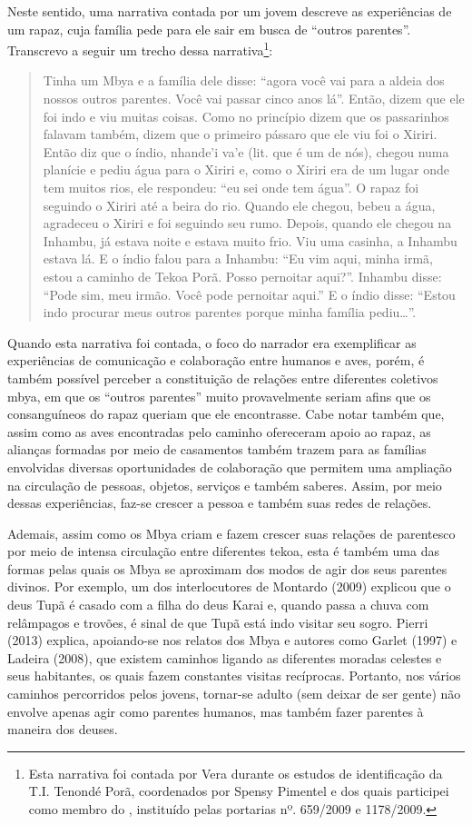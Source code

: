Neste sentido, uma narrativa contada por um jovem descreve as
experiências de um rapaz, cuja família pede para ele sair em busca de
``outros parentes''. Transcrevo a seguir um trecho dessa
narrativa\footnote{Esta narrativa foi contada por Vera durante os
estudos de identificação da T.I. Tenondé Porã, coordenados por Spensy
Pimentel e dos quais participei como membro do , instituído pelas
portarias nº. 659/2009 e 1178/2009.}: 

\begin{quotation}
Tinha um Mbya e a família dele disse: ``agora você vai para a aldeia dos
nossos outros parentes. Você vai passar cinco anos lá''. Então, dizem
que ele foi indo e viu muitas coisas. Como no princípio dizem que os
passarinhos falavam também, dizem que o primeiro pássaro que ele viu
foi o Xiriri. Então diz que o índio, nhande’i va’e (lit. que é um de
nós), chegou numa planície e pediu água para o Xiriri e, como o Xiriri
era de um lugar onde tem muitos rios, ele respondeu: ``eu sei onde tem
água''. O rapaz foi seguindo o Xiriri até a beira do rio. Quando ele
chegou, bebeu a água, agradeceu o Xiriri e foi seguindo seu rumo.
Depois, quando ele chegou na Inhambu, já estava noite e estava muito
frio. Viu uma casinha, a Inhambu estava lá. E o índio falou para a
Inhambu: ``Eu vim aqui, minha irmã, estou a caminho de Tekoa Porã. Posso
pernoitar aqui?''. Inhambu disse: ``Pode sim, meu irmão. Você pode
pernoitar aqui.'' E o índio disse: ``Estou indo procurar meus outros
parentes porque minha família pediu\ldots{}''. 

\end{quotation}
Quando esta narrativa foi contada, o foco do narrador era exemplificar
as experiências de comunicação e colaboração entre humanos e aves,
porém, é também possível perceber a constituição de relações entre
diferentes coletivos mbya, em que os ``outros parentes'' muito
provavelmente seriam afins que os consanguíneos do rapaz queriam que
ele encontrasse. Cabe notar também que, assim como as aves encontradas
pelo caminho ofereceram apoio ao rapaz, as alianças formadas por meio
de casamentos também trazem para as famílias envolvidas diversas
oportunidades de colaboração que permitem uma ampliação na circulação
de pessoas, objetos, serviços e também saberes. Assim, por meio dessas
experiências, faz-se crescer a pessoa e também suas redes de relações.

Ademais, assim como os Mbya criam e fazem crescer suas relações de
parentesco por meio de intensa circulação entre diferentes tekoa, esta
é também uma das formas pelas quais os Mbya se aproximam dos modos de
agir dos seus parentes divinos. Por exemplo, um dos interlocutores de
Montardo (2009) explicou que o deus Tupã é casado com a filha do deus
Karai e, quando passa a chuva com relâmpagos e trovões, é sinal de que
Tupã está indo visitar seu sogro. Pierri (2013) explica, apoiando-se
nos relatos dos Mbya e autores como Garlet (1997) e Ladeira (2008), que
existem caminhos ligando as diferentes moradas celestes e seus
habitantes, os quais fazem constantes visitas recíprocas. Portanto, nos
vários caminhos percorridos pelos jovens, tornar-se adulto (sem deixar
de ser gente) não envolve apenas agir como parentes humanos, mas também
fazer parentes à maneira dos deuses.

